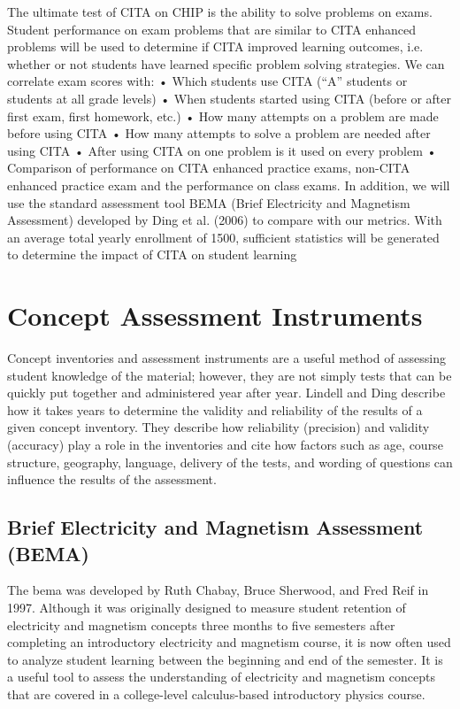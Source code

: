 The ultimate test of CITA on CHIP is the ability to solve problems on exams. Student
performance on exam problems that are similar to CITA enhanced problems will be used to
determine if CITA improved learning outcomes, i.e. whether or not students have learned
specific problem solving strategies. We can correlate exam scores with:
• Which students use CITA (“A” students or students at all grade levels)
• When students started using CITA (before or after first exam, first homework, etc.)
• How many attempts on a problem are made before using CITA
• How many attempts to solve a problem are needed after using CITA
• After using CITA on one problem is it used on every problem
• Comparison of performance on CITA enhanced practice exams, non-CITA enhanced
practice exam and the performance on class exams.
In addition, we will use the standard assessment tool BEMA (Brief Electricity and Magnetism
Assessment) developed by Ding et al. (2006) to compare with our metrics. With an average total
yearly enrollment of 1500, sufficient statistics will be generated to determine the impact of CITA
on student learning

\section{Concept Assessment Instruments}

Concept inventories and assessment instruments are a useful method of assessing student knowledge of the material; however, they are not simply tests that can be quickly put together and administered year after year. Lindell and Ding describe how it takes years to determine the validity and reliability of the results of a given concept inventory. They describe how reliability (precision) and validity (accuracy) play a role in the inventories and cite how factors such as age, course structure, geography, language, delivery of the tests, and wording of questions can influence the results of the assessment\cite{lindell2012}.

\subsection{Brief Electricity and Magnetism Assessment (BEMA)}

The \gls{bema} was developed by Ruth Chabay, Bruce Sherwood, and Fred Reif in 1997. Although it was originally designed to measure student retention of electricity and magnetism concepts three months to five semesters after completing an introductory electricity and magnetism course, it is now often used to analyze student learning between the beginning and end of the semester. It is a useful tool to assess the understanding of electricity and magnetism concepts that are covered in a college-level calculus-based introductory physics course\cite{ding2006}.

